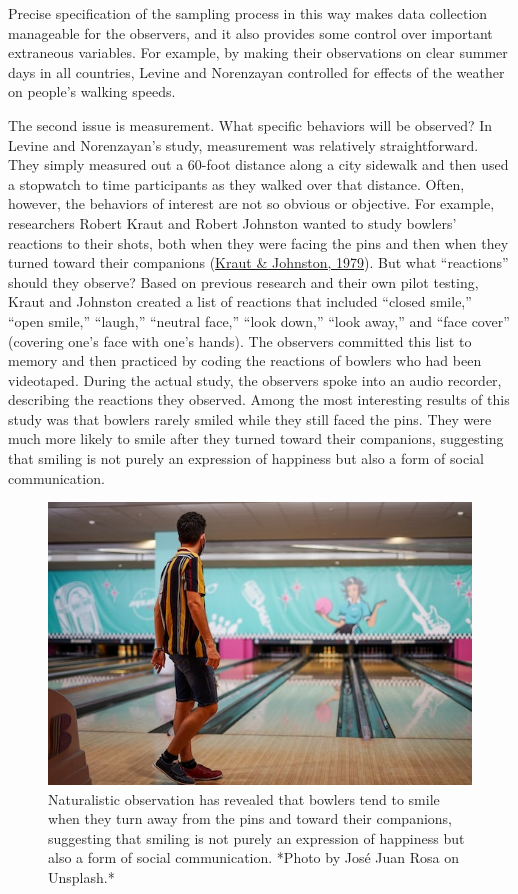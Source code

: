 \documentclass[
]{krantz}
\begin{document}
Precise specification of the sampling process in this way makes data collection manageable for the observers, and it also provides some control over important extraneous variables. For example, by making their observations on clear summer days in all countries, Levine and Norenzayan controlled for effects of the weather on people's walking speeds.

The second issue is measurement. What specific behaviors will be observed? In Levine and Norenzayan's study, measurement was relatively straightforward. They simply measured out a 60-foot distance along a city sidewalk and then used a stopwatch to time participants as they walked over that distance. Often, however, the behaviors of interest are not so obvious or objective. For example, researchers Robert Kraut and Robert Johnston wanted to study bowlers' reactions to their shots, both when they were facing the pins and then when they turned toward their companions (\protect\hyperlink{ref-kraut1979social}{Kraut \& Johnston, 1979}). But what ``reactions'' should they observe? Based on previous research and their own pilot testing, Kraut and Johnston created a list of reactions that included ``closed smile,'' ``open smile,'' ``laugh,'' ``neutral face,'' ``look down,'' ``look away,'' and ``face cover'' (covering one's face with one's hands). The observers committed this list to memory and then practiced by coding the reactions of bowlers who had been videotaped. During the actual study, the observers spoke into an audio recorder, describing the reactions they observed. Among the most interesting results of this study was that bowlers rarely smiled while they still faced the pins. They were much more likely to smile after they turned toward their companions, suggesting that smiling is not purely an expression of happiness but also a form of social communication.

\begin{figure}

{\centering \includegraphics[width=0.5\linewidth]{images/nonexperiments/bowl} 

}

\caption{Naturalistic observation has revealed that bowlers tend to smile when they turn away from the pins and toward their companions, suggesting that smiling is not purely an expression of happiness but also a form of social communication. *Photo by José Juan Rosa on Unsplash.*}\label{fig:bowl}
\end{figure}
\end{document}
